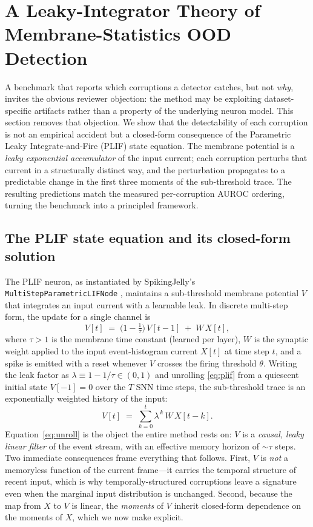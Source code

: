 \section{A Leaky-Integrator Theory of Membrane-Statistics OOD Detection}
\label{sec:theory}

A benchmark that reports which corruptions a detector catches, but not \emph{why},
invites the obvious reviewer objection: the method may be exploiting dataset-specific
artifacts rather than a property of the underlying neuron model. This section removes that
objection. We show that the detectability of each corruption is not an empirical accident
but a closed-form consequence of the Parametric Leaky Integrate-and-Fire (PLIF) state
equation. The membrane potential is a \emph{leaky exponential accumulator} of the input
current; each corruption perturbs that current in a structurally distinct way, and the
perturbation propagates to a predictable change in the first three moments of the
sub-threshold trace. The resulting predictions match the measured per-corruption AUROC
ordering, turning the benchmark into a principled framework.

\subsection{The PLIF state equation and its closed-form solution}
\label{sec:theory-state}

The PLIF neuron, as instantiated by SpikingJelly's \texttt{MultiStepParametricLIFNode}
\cite{fang2021plif}, maintains a sub-threshold membrane potential $V$ that integrates an
input current with a learnable leak. In discrete multi-step form, the update for a single
channel is
%
\begin{equation}
  V[t] \;=\; \Big(1 - \tfrac{1}{\tau}\Big)\, V[t-1] \;+\; W\, X[t],
  \label{eq:plif}
\end{equation}
%
where $\tau > 1$ is the membrane time constant (learned per layer), $W$ is the synaptic
weight applied to the input event-histogram current $X[t]$ at time step $t$, and a spike is
emitted with a reset whenever $V$ crosses the firing threshold $\theta$. Writing the leak
factor as $\lambda \equiv 1 - 1/\tau \in (0,1)$ and unrolling \eqref{eq:plif} from a
quiescent initial state $V[-1]=0$ over the $T$ SNN time steps, the sub-threshold trace is an
exponentially weighted history of the input:
%
\begin{equation}
  V[t] \;=\; \sum_{k=0}^{t} \lambda^{\,k}\, W\, X[t-k].
  \label{eq:unroll}
\end{equation}
%
Equation~\eqref{eq:unroll} is the object the entire method rests on: $V$ is a \emph{causal,
leaky linear filter} of the event stream, with an effective memory horizon of $\sim\tau$
steps. Two immediate consequences frame everything that follows. First, $V$ is \emph{not} a
memoryless function of the current frame---it carries the temporal structure of recent
input, which is why temporally-structured corruptions leave a signature even when the
marginal input distribution is unchanged. Second, because the map from $X$ to $V$ is linear,
the \emph{moments} of $V$ inherit closed-form dependence on the moments of $X$, which we now
make explicit.

